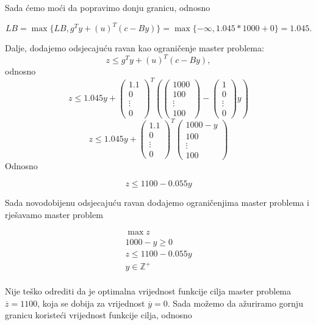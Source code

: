 \documentclass[a4paper, utf8, 11pt, colorlinks]{book}
\theoremstyle{definition}
\begin{document}
Sada ćemo moći da popravimo donju granicu, odnosno

$$LB = \max\{LB,g^Ty+(u)^T(c-By)\}=\max\{-\infty,1.045*1000+0\} = 1.045.$$

Dalje, dodajemo odsjecajuću ravan kao ograničenje master problema:
$$z\leqslant g^Ty+(u)^T(c-By),$$ 
odnosno
$$z\leqslant 1.045y+\left(\begin{array}{c}
	1.1 \\
	0 \\
	\vdots \\
	0
\end{array}\right)^T
\left(\left(\begin{array}{c}
	1000 \\
	100 \\
	\vdots \\
	100
\end{array}\right)-\left(\begin{array}{c}
1 \\
0 \\
\vdots \\
0
\end{array}\right)y\right)$$
$$z\leqslant 1.045y+\left(\begin{array}{c}
	1.1 \\
	0 \\
	\vdots \\
	0
\end{array}\right)^T
\left(\begin{array}{c}
	1000-y \\
	100 \\
	\vdots \\
	100
\end{array}\right)$$
Odnosno

$$z\leqslant 1100-0.055y$$

Sada novodobijenu odsjecajuću ravan dodajemo ograničenjima master problema i rješavamo master problem

$$
\begin{aligned}
	\max z\\
	1000-y\geqslant 0\\
	z\leqslant 1100-0.055y\\ 
	y\in\mathbb{Z}^+\\	
\end{aligned}
$$

Nije teško odrediti da je optimalna vrijednost funkcije cilja master problema $\overline{z}=1100$, koja se dobija za vrijednost $\overline{y}=0$.
Sada možemo da ažuriramo gornju granicu koristeći vrijednost funkcije cilja, odnosno
\end{document}
